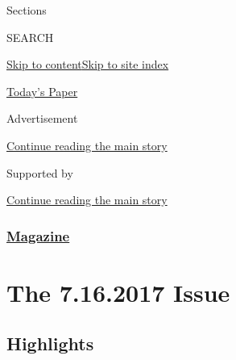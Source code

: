 Sections

SEARCH

\protect\hyperlink{site-content}{Skip to
content}\protect\hyperlink{site-index}{Skip to site index}

\href{https://myaccount.nytimes3xbfgragh.onion/auth/login?response_type=cookie\&client_id=vi}{}

\href{https://www.nytimes3xbfgragh.onion/section/todayspaper}{Today's
Paper}

Advertisement

\protect\hyperlink{after-top}{Continue reading the main story}

Supported by

\protect\hyperlink{after-sponsor}{Continue reading the main story}

\hypertarget{magazine}{%
\subsubsection{\texorpdfstring{\href{/section/magazine}{Magazine}}{Magazine}}\label{magazine}}

\hypertarget{the-7162017-issue}{%
\section{The 7.16.2017 Issue}\label{the-7162017-issue}}

\hypertarget{highlights}{%
\subsection{Highlights}\label{highlights}}

